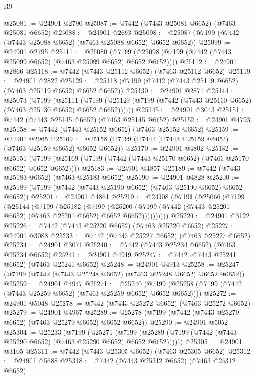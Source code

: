 \begin{lexlean}{R9}
\begin{coremodule}
@25081 := @24901 @2790
@25087 := @7442 (@7443 @25081 @6652) (@7463 @25081 @6652)
@25088 := @24901 @2693
@25098 := @25087 (@7199 (@7442 (@7443 @25088 @6652) (@7463 @25088 @6652) @6652 @6652))
@25099 := @24901 @2795
@25111 := @25080
    (@7199 (@25098 (@7199 (@7442 (@7443 @25099 @6652) (@7463 @25099 @6652) @6652 @6652))))
@25112 := @24901 @2866
@25118 := @7442 (@7443 @25112 @6652) (@7463 @25112 @6652)
@25119 := @24901 @2822
@25129 := @25118 (@7199 (@7442 (@7443 @25119 @6652) (@7463 @25119 @6652) @6652 @6652))
@25130 := @24901 @2871
@25144 := @25073
    (@7199
      (@25111
        (@7199 (@25129 (@7199 (@7442 (@7443 @25130 @6652) (@7463 @25130 @6652) @6652 @6652))))))
@25145 := @24901 @3043
@25151 := @7442 (@7443 @25145 @6652) (@7463 @25145 @6652)
@25152 := @24901 @4793
@25158 := @7442 (@7443 @25152 @6652) (@7463 @25152 @6652)
@25159 := @24901 @2965
@25169 := @25158 (@7199 (@7442 (@7443 @25159 @6652) (@7463 @25159 @6652) @6652 @6652))
@25170 := @24901 @4802
@25182 := @25151
    (@7199 (@25169 (@7199 (@7442 (@7443 @25170 @6652) (@7463 @25170 @6652) @6652 @6652))))
@25183 := @24901 @4857
@25189 := @7442 (@7443 @25183 @6652) (@7463 @25183 @6652)
@25190 := @24901 @4828
@25200 := @25189 (@7199 (@7442 (@7443 @25190 @6652) (@7463 @25190 @6652) @6652 @6652))
@25201 := @24901 @4861
@25219 := @24908
    (@7199
      (@25066
        (@7199
          (@25144
            (@7199
              (@25182
                (@7199
                  (@25200
                    (@7199 (@7442 (@7443 @25201 @6652) (@7463 @25201 @6652) @6652 @6652))))))))))
@25220 := @24901 @3122
@25226 := @7442 (@7443 @25220 @6652) (@7463 @25220 @6652)
@25227 := @24901 @3088
@25233 := @7442 (@7443 @25227 @6652) (@7463 @25227 @6652)
@25234 := @24901 @3071
@25240 := @7442 (@7443 @25234 @6652) (@7463 @25234 @6652)
@25241 := @24901 @4919
@25247 := @7442 (@7443 @25241 @6652) (@7463 @25241 @6652)
@25248 := @24901 @4913
@25258 := @25247 (@7199 (@7442 (@7443 @25248 @6652) (@7463 @25248 @6652) @6652 @6652))
@25259 := @24901 @4947
@25271 := @25240
    (@7199 (@25258 (@7199 (@7442 (@7443 @25259 @6652) (@7463 @25259 @6652) @6652 @6652))))
@25272 := @24901 @5048
@25278 := @7442 (@7443 @25272 @6652) (@7463 @25272 @6652)
@25279 := @24901 @4967
@25289 := @25278 (@7199 (@7442 (@7443 @25279 @6652) (@7463 @25279 @6652) @6652 @6652))
@25290 := @24901 @5052
@25304 := @25233
    (@7199
      (@25271
        (@7199 (@25289 (@7199 (@7442 (@7443 @25290 @6652) (@7463 @25290 @6652) @6652 @6652))))))
@25305 := @24901 @3105
@25311 := @7442 (@7443 @25305 @6652) (@7463 @25305 @6652)
@25312 := @24901 @5688
@25318 := @7442 (@7443 @25312 @6652) (@7463 @25312 @6652)

\end{coremodule}
\end{lexlean}
